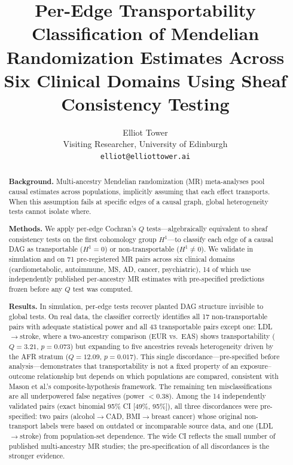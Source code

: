 \documentclass[11pt]{article}
\title{Per-Edge Transportability Classification of Mendelian Randomization Estimates Across Six Clinical Domains Using Sheaf Consistency Testing}
\author{Elliot Tower\\
Visiting Researcher, University of Edinburgh\\
\texttt{elliot@elliottower.ai}}
\date{}
\begin{document}
\maketitle

\begin{abstract}
\noindent\textbf{Background.}
Multi-ancestry Mendelian randomization (MR) meta-analyses pool causal estimates across populations, implicitly assuming that each effect transports. When this assumption fails at specific edges of a causal graph, global heterogeneity tests cannot isolate where.

\noindent\textbf{Methods.}
We apply per-edge Cochran's $Q$ tests---algebraically equivalent to sheaf consistency tests on the first cohomology group $H^1$---to classify each edge of a causal DAG as transportable ($H^1 = 0$) or non-transportable ($H^1 \neq 0$). We validate in simulation and on 71 pre-registered MR pairs across six clinical domains (cardiometabolic, autoimmune, MS, AD, cancer, psychiatric), 14 of which use independently published per-ancestry MR estimates with pre-specified predictions frozen before any $Q$ test was computed.

\noindent\textbf{Results.}
In simulation, per-edge tests recover planted DAG structure invisible to global tests. On real data, the classifier correctly identifies all 17 non-transportable pairs with adequate statistical power and all 43 transportable pairs except one: LDL$\to$stroke, where a two-ancestry comparison (EUR vs.\ EAS) shows transportability ($Q = 3.21$, $p = 0.073$) but expanding to five ancestries reveals heterogeneity driven by the AFR stratum ($Q = 12.09$, $p = 0.017$). This single discordance---pre-specified before analysis---demonstrates that transportability is not a fixed property of an exposure--outcome relationship but depends on which populations are compared, consistent with Mason et al.'s composite-hypothesis framework. The remaining ten misclassifications are all underpowered false negatives (power $< 0.38$). Among the 14 independently validated pairs (exact binomial 95\% CI [49\%, 95\%]), all three discordances were pre-specified: two pairs (alcohol$\to$CAD, BMI$\to$breast cancer) whose original non-transport labels were based on outdated or incomparable source data, and one (LDL$\to$stroke) from population-set dependence. The wide CI reflects the small number of published multi-ancestry MR studies; the pre-specification of all discordances is the stronger evidence.


\end{abstract}
\end{document}
